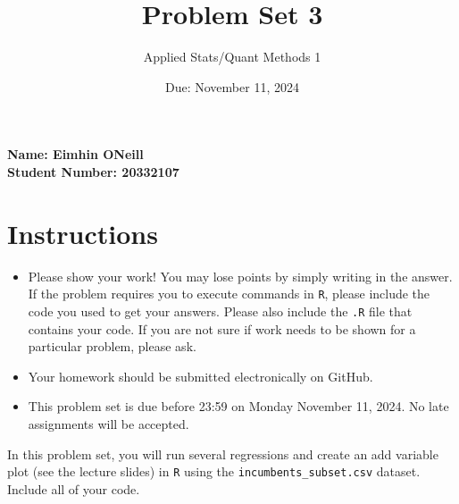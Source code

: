 \documentclass[12pt,letterpaper]{article}
\title{Problem Set 3}
\date{Due: November 11, 2024}
\author{Applied Stats/Quant Methods 1}
\begin{document}
	\maketitle
	\vspace{-2em} 
	\noindent \textbf{Name: Eimhin ONeill} \\
	\noindent \textbf{Student Number: 20332107} \\
	
	\section*{Instructions}
	\begin{itemize}
		\item Please show your work! You may lose points by simply writing in the answer. If the problem requires you to execute commands in \texttt{R}, please include the code you used to get your answers. Please also include the \texttt{.R} file that contains your code. If you are not sure if work needs to be shown for a particular problem, please ask.
	\item Your homework should be submitted electronically on GitHub.
	\item This problem set is due before 23:59 on Monday November 11, 2024. No late assignments will be accepted.

	\end{itemize}

		\vspace{.25cm}
	
\noindent In this problem set, you will run several regressions and create an add variable plot (see the lecture slides) in \texttt{R} using the \texttt{incumbents\_subset.csv} dataset. Include all of your code.

	\vspace{.5cm}
\end{document}
